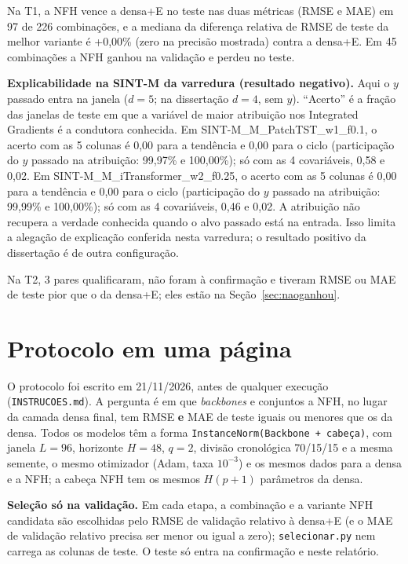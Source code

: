 \documentclass[11pt,a4paper]{article}
\begin{document}
Na T1, a NFH vence a densa+E no teste nas duas métricas (RMSE e MAE) em 97 de 226 combinações, e a mediana da diferença relativa de RMSE de teste da melhor variante é +0,00\% (zero na precisão mostrada) contra a densa+E. Em 45 combinações a NFH ganhou na validação e perdeu no teste.

\textbf{Explicabilidade na SINT-M da varredura (resultado negativo).} Aqui o $y$ passado entra na janela ($d=5$; na dissertação $d=4$, sem $y$). ``Acerto'' é a fração das janelas de teste em que a variável de maior atribuição nos Integrated Gradients é a condutora conhecida. 
Em SINT-\allowbreak{}M\_\allowbreak{}M\_\allowbreak{}PatchTST\_\allowbreak{}w1\_\allowbreak{}f0.\allowbreak{}1, o acerto com as 5 colunas é 0,00 para a tendência e 0,00 para o ciclo (participação do $y$ passado na atribuição: 99,97\% e 100,00\%); só com as 4 covariáveis, 0,58 e 0,02. 
Em SINT-\allowbreak{}M\_\allowbreak{}M\_\allowbreak{}iTransformer\_\allowbreak{}w2\_\allowbreak{}f0.\allowbreak{}25, o acerto com as 5 colunas é 0,00 para a tendência e 0,00 para o ciclo (participação do $y$ passado na atribuição: 99,99\% e 100,00\%); só com as 4 covariáveis, 0,46 e 0,02. 
A atribuição não recupera a verdade conhecida quando o alvo passado está na entrada. Isso limita a alegação de explicação conferida nesta varredura; o resultado positivo da dissertação é de outra configuração.

Na T2, 3 pares qualificaram, não foram à confirmação e tiveram RMSE ou MAE de teste pior que o da densa+E; eles estão na Seção~\ref{sec:naoganhou}.

\section{Protocolo em uma página}
O protocolo foi escrito em 21/11/2026, antes de qualquer execução (\texttt{INSTRUCOES.md}). A pergunta é em que \emph{backbones} e conjuntos a NFH, no lugar da camada densa final, tem RMSE \textbf{e} MAE de teste iguais ou menores que os da densa. Todos os modelos têm a forma \texttt{InstanceNorm(Backbone + cabeça)}, com janela $L=96$, horizonte $H=48$, $q=2$, divisão cronológica 70/15/15 e a mesma semente, o mesmo otimizador (Adam, taxa $10^{-3}$) e os mesmos dados para a densa e a NFH; a cabeça NFH tem os mesmos $H(p+1)$ parâmetros da densa.

\textbf{Seleção só na validação.} Em cada etapa, a combinação e a variante NFH candidata são escolhidas pelo RMSE de validação relativo à densa+E (e o MAE de validação relativo precisa ser menor ou igual a zero); \texttt{selecionar.py} nem carrega as colunas de teste. O teste só entra na confirmação e neste relatório.
\end{document}
